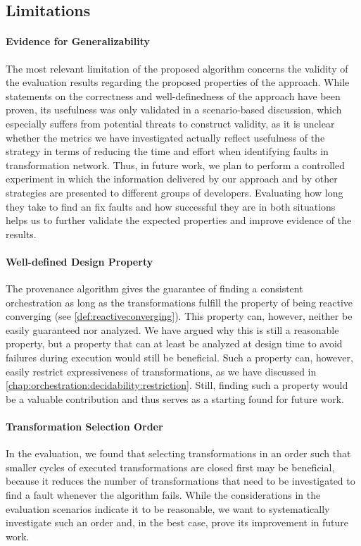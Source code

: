 \subsection{Limitations}

\paragraph{Evidence for Generalizability}
The most relevant limitation of the proposed algorithm concerns the validity of the evaluation results regarding the proposed properties of the approach.
While statements on the correctness and well-definedness of the approach have been proven, its usefulness was only validated in a scenario-based discussion, which especially suffers from potential threats to construct validity, as it is unclear whether the metrics we have investigated actually reflect usefulness of the strategy in terms of reducing the time and effort when identifying faults in transformation network.
Thus, in future work, we plan to perform a controlled experiment in which the information delivered by our approach and by other strategies are presented to different groups of developers.
Evaluating how long they take to find an fix faults and how successful they are in both situations helps us to further validate the expected properties and improve evidence of the results.

\paragraph{Well-defined Design Property}
The provenance algorithm gives the guarantee of finding a consistent orchestration as long as the transformations fulfill the property of being reactive converging (see \autoref{def:reactiveconverging}).
This property can, however, neither be easily guaranteed nor analyzed.
We have argued why this is still a reasonable property, but a property that can at least be analyzed at design time to avoid failures during execution would still be beneficial.
Such a property can, however, easily restrict expressiveness of transformations, as we have discussed in \autoref{chap:orchestration:decidability:restriction}.
Still, finding such a property would be a valuable contribution and thus serves as a starting found for future work.

\paragraph{Transformation Selection Order}
In the evaluation, we found that selecting transformations in an order such that smaller cycles of executed transformations are closed first may be beneficial, because it reduces the number of transformations that need to be investigated to find a fault whenever the algorithm fails.
While the considerations in the evaluation scenarios indicate it to be reasonable, we want to systematically investigate such an order and, in the best case, prove its improvement in future work.

